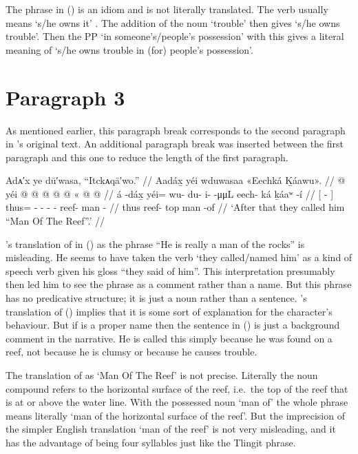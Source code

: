 The phrase in (\lastx) is an idiom and is not literally translated.
The verb  usually means ‘s/he owns it’ \parencite[147]{leer:1976}.
The addition of the noun  ‘trouble’ then gives ‘s/he owns trouble’.
Then the PP  ‘in someone’s/people’s possession’ with this gives a literal meaning of ‘s/he owns trouble in (for) people’s possession’.

\section{Paragraph 3}\label{sec:106-para-3}

As mentioned earlier, this paragraph break corresponds to the second paragraph in \citeauthor{swanton:1909}’s original text.
An additional paragraph break was inserted between the first paragraph and this one to reduce the length of the first paragraph.

\ex\label{ex:106-35-call-him-reefman}%
%
\begingl
	\glpreamble	Adᴀ′x ye dū′wasa, “Itckᴀqā′wo.” //
	\glpreamble	Aadáx̱ yéi wduwasaa «\!Eechká Ḵáawu\!». //
	\gla	{}  @ {}
		{} yéi @  @ {} @ {} @ {} @ {} 
			«\! @ {}  @ {} //
	\glb	{} á -dáx̱ {}
		yéi= wu- du- i-  -μμL
			\pqp{}eech- ká ḵáaʷ -í //
	\glc	{}[  - {}]
		thus= - - -  -
			\pqp{}reef-  man - //
	\gld	{}  {} {}
		thus  {} {} {} {} 
			\pqp{}reef- top man -of //
	\glft	‘After that they called him “Man Of The Reef”.’
		//
\endgl
\xe

\citeauthor{swanton:1909}’s translation of  in (\lastx) as the phrase “He is really a man of the rocks” is misleading.
He seems to have taken the verb  ‘they called/named him’ as a kind of speech verb given his gloss “they said of him”.
This interpretation presumably then led him to see the phrase  as a comment rather than a name.
But this phrase has no predicative structure; it is just a noun rather than a sentence.
\citeauthor{swanton:1909}’s translation of (\lastx) implies that it is some sort of explanation for the character’s behaviour.
But if  is a proper name then the sentence in (\lastx) is just a background comment in the narrative.
He is called this simply because he was found on a reef, not because he is clumsy or because he causes trouble.

The translation of  as ‘Man Of The Reef’ is not precise.
Literally the noun compound  refers to the horizontal surface of the reef, i.e.\ the top of the reef that is at or above the water line.
With the possessed noun  ‘man of’ the whole phrase means literally ‘man of the horizontal surface of the reef’.
But the imprecision of the simpler English translation ‘man of the reef’ is not very misleading, and it has the advantage of being four syllables just like the Tlingit phrase.

